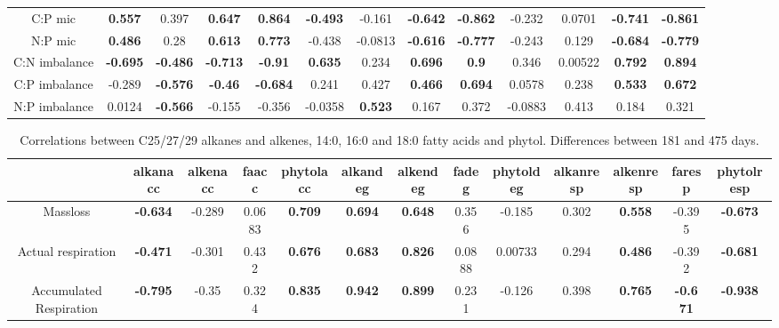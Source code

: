 \documentclass[authoryear,preprint,review,12pt]{elsarticle}
\begin{document}
\begin{landscape}
\begin{table}[h!]
\begin{center}
{\begin{tabular}{ccccccccccccc}
  C:P mic & \textbf{ 0.557 } & 0.397 & \textbf{ 0.647 } & \textbf{ 0.864 } & \textbf{ -0.493 } & -0.161 & \textbf{ -0.642 } & \textbf{ -0.862 } & -0.232 & 0.0701 & \textbf{ -0.741 } & \textbf{ -0.861 } \\ 
  N:P mic & \textbf{ 0.486 } & 0.28 & \textbf{ 0.613 } & \textbf{ 0.773 } & -0.438 & -0.0813 & \textbf{ -0.616 } & \textbf{ -0.777 } & -0.243 & 0.129 & \textbf{ -0.684 } & \textbf{ -0.779 } \\ 
  C:N imbalance & \textbf{ -0.695 } & \textbf{ -0.486 } & \textbf{ -0.713 } & \textbf{ -0.91 } & \textbf{ 0.635 } & 0.234 & \textbf{ 0.696 } & \textbf{  0.9 } & 0.346 & 0.00522 & \textbf{ 0.792 } & \textbf{ 0.894 } \\ 
  C:P imbalance & -0.289 & \textbf{ -0.576 } & \textbf{ -0.46 } & \textbf{ -0.684 } & 0.241 & 0.427 & \textbf{ 0.466 } & \textbf{ 0.694 } & 0.0578 & 0.238 & \textbf{ 0.533 } & \textbf{ 0.672 } \\ 
  N:P imbalance & 0.0124 & \textbf{ -0.566 } & -0.155 & -0.356 & -0.0358 & \textbf{ 0.523 } & 0.167 & 0.372 & -0.0883 & 0.413 & 0.184 & 0.321 \\ 
   \hline
\end{tabular}
}
\end{center}
\end{table}
\newpage
\begin{table}[h!]
\begin{center}
\caption{Correlations between C25/27/29 alkanes and alkenes, 14:0, 16:0 and 18:0 fatty acids and phytol. Differences between 181 and 475 days.}
\label{corrtable2_notlig}
{\tiny
\begin{tabular}{ccccccccccccc}
  \hline
 & alkanacc & alkenacc & faacc & phytolacc & alkandeg & alkendeg & fadeg & phytoldeg & alkanresp & alkenresp & faresp & phytolresp \\ 
  \hline
Massloss & \textbf{ -0.634 } & -0.289 & 0.0683 & \textbf{ 0.709 } & \textbf{ 0.694 } & \textbf{ 0.648 } & 0.356 & -0.185 & 0.302 & \textbf{ 0.558 } & -0.395 & \textbf{ -0.673 } \\ 
  Actual respiration & \textbf{ -0.471 } & -0.301 & 0.432 & \textbf{ 0.676 } & \textbf{ 0.683 } & \textbf{ 0.826 } & 0.0888 & 0.00733 & 0.294 & \textbf{ 0.486 } & -0.392 & \textbf{ -0.681 } \\ 
  Accumulated Respiration & \textbf{ -0.795 } & -0.35 & 0.324 & \textbf{ 0.835 } & \textbf{ 0.942 } & \textbf{ 0.899 } & 0.231 & -0.126 & 0.398 & \textbf{ 0.765 } & \textbf{ -0.671 } & \textbf{ -0.938 } \\ 

\end{tabular}}
\end{center}
\end{table}
\end{landscape}
\end{document}
